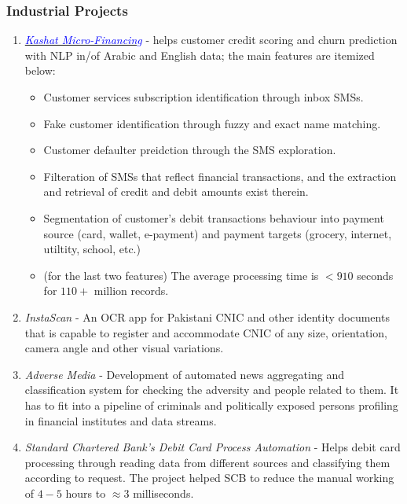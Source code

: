 \documentclass[a4paper, 10pt]{article}
\begin{document}
\subsubsection*{Industrial Projects}
\begin{enumerate}
\itemsep = 0em
\item {\it \href{https://kashat.com.eg/en/}{\textcolor{blue}{Kashat Micro-Financing}}} - helps {customer credit scoring} and {churn prediction} with NLP in/of {Arabic}
and {English} data; the main features are itemized below:
\begin{itemize}
\itemsep = 0em

\item Customer {services subscription identification} through inbox SMSs.

\item {Fake customer identification} through fuzzy and exact name matching.

\item {Customer defaulter preidction} through the SMS exploration.

\item Filteration of SMSs that reflect financial transactions, and the {extraction and retrieval of credit and debit amounts} exist therein.

\item Segmentation of {customer's debit transactions behaviour into payment source} (card, wallet, e-payment) and {payment targets} (grocery, internet, utiltity, school, etc.)

\item (for the last two features) The average processing time is $<\!910$ seconds for $110+$ million records.
\end{itemize}

\item {\it InstaScan} - An OCR app for Pakistani CNIC and other identity documents that is capable to register and accommodate CNIC of any size, orientation, camera angle and other visual variations.

\item {\it Adverse Media} - Development of automated news aggregating and classification system for checking the adversity and people related to them. It has to fit into a pipeline of criminals and politically exposed persons profiling in financial institutes and data streams.

\item {\it Standard Chartered Bank's Debit Card Process Automation} - Helps debit card processing through reading data from different sources and classifying them according to request. The project helped SCB to reduce the manual working of $4\!-\!5$ hours to $\approx\!3$ milliseconds.


\end{enumerate}
\end{document}
